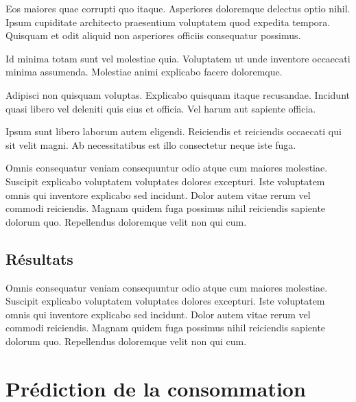 \documentclass[a4paper]{article}
\begin{document}
\begin{multicols}{2}
Eos maiores quae corrupti quo itaque. Asperiores doloremque delectus optio
nihil. Ipsum cupiditate architecto praesentium voluptatem quod expedita tempora.
Quisquam et odit aliquid non asperiores officiis consequatur possimus.

Id minima totam sunt vel molestiae quia. Voluptatem ut unde inventore occaecati
minima assumenda. Molestiae animi explicabo facere doloremque.

Adipisci non quisquam voluptas. Explicabo quisquam itaque recusandae. Incidunt
quasi libero vel deleniti quis eius et officia. Vel harum aut sapiente officia.

Ipsum sunt libero laborum autem eligendi. Reiciendis et reiciendis occaecati qui
sit velit magni. Ab necessitatibus est illo consectetur neque iste fuga.

Omnis consequatur veniam consequuntur odio atque cum maiores molestiae. Suscipit
explicabo voluptatem voluptates dolores excepturi. Iste voluptatem omnis qui
inventore explicabo sed incidunt. Dolor autem vitae rerum vel commodi
reiciendis. Magnam quidem fuga possimus nihil reiciendis sapiente dolorum quo.
Repellendus doloremque velit non qui cum.

\end{multicols}

\subsection{Résultats}
Omnis consequatur veniam consequuntur odio atque cum maiores molestiae. Suscipit
explicabo voluptatem voluptates dolores excepturi. Iste voluptatem omnis qui
inventore explicabo sed incidunt. Dolor autem vitae rerum vel commodi
reiciendis. Magnam quidem fuga possimus nihil reiciendis sapiente dolorum quo.
Repellendus doloremque velit non qui cum.

\clearpage
\section{Prédiction de la consommation}
\end{document}
